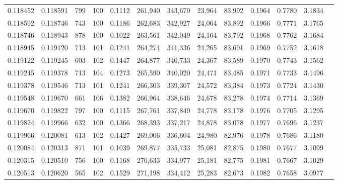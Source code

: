 \begin{tabular}{rrrrrrrrrrrrr}
0.118452 & 0.118591 &   799 & 100 &                                     0.1112 & 261,940 & 343,670 &  23,964 &  83,992 & 0.1964 & 0.7780 & 3.1834 \\
0.118592 & 0.118746 &   743 & 100 &                                     0.1186 & 262,683 & 342,927 &  24,064 &  83,892 & 0.1966 & 0.7771 & 3.1765 \\
0.118746 & 0.118943 &   878 & 100 &                                     0.1022 & 263,561 & 342,049 &  24,164 &  83,792 & 0.1968 & 0.7762 & 3.1684 \\
0.118945 & 0.119120 &   713 & 101 &                                     0.1241 & 264,274 & 341,336 &  24,265 &  83,691 & 0.1969 & 0.7752 & 3.1618 \\
0.119122 & 0.119245 &   603 & 102 &                                     0.1447 & 264,877 & 340,733 &  24,367 &  83,589 & 0.1970 & 0.7743 & 3.1562 \\
0.119245 & 0.119378 &   713 & 104 &                                     0.1273 & 265,590 & 340,020 &  24,471 &  83,485 & 0.1971 & 0.7733 & 3.1496 \\
0.119378 & 0.119546 &   713 & 101 &                                     0.1241 & 266,303 & 339,307 &  24,572 &  83,384 & 0.1973 & 0.7724 & 3.1430 \\
0.119548 & 0.119670 &   661 & 106 &                                     0.1382 & 266,964 & 338,646 &  24,678 &  83,278 & 0.1974 & 0.7714 & 3.1369 \\
0.119670 & 0.119822 &   797 & 100 &                                     0.1115 & 267,761 & 337,849 &  24,778 &  83,178 & 0.1976 & 0.7705 & 3.1295 \\
0.119824 & 0.119966 &   632 & 100 &                                     0.1366 & 268,393 & 337,217 &  24,878 &  83,078 & 0.1977 & 0.7696 & 3.1237 \\
0.119966 & 0.120081 &   613 & 102 &                                     0.1427 & 269,006 & 336,604 &  24,980 &  82,976 & 0.1978 & 0.7686 & 3.1180 \\
0.120084 & 0.120313 &   871 & 101 &                                     0.1039 & 269,877 & 335,733 &  25,081 &  82,875 & 0.1980 & 0.7677 & 3.1099 \\
0.120315 & 0.120510 &   756 & 100 &                                     0.1168 & 270,633 & 334,977 &  25,181 &  82,775 & 0.1981 & 0.7667 & 3.1029 \\
0.120513 & 0.120620 &   565 & 102 &                                     0.1529 & 271,198 & 334,412 &  25,283 &  82,673 & 0.1982 & 0.7658 & 3.0977 \\

\end{tabular}
